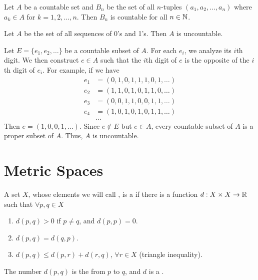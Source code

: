 \documentclass{mathnotes}
\begin{document}
\begin{prop}
  Let $A$ be a countable set and $B_n$ be the set of all $n$-tuples
  $(a_1,a_2,\ldots,a_n)$ where $a_k\in A$ for $k=1,2,\ldots,n$. Then $B_n$ is
  countable for all $n\in\mathbb{N}$.
\end{prop}

\begin{thm}
  Let $A$ be the set of all sequences of 0's and 1's. Then $A$ is uncountable.
\end{thm}

\begin{pf}
  Let $E=\{e_1,e_2,\ldots\}$ be a countable subset of $A$. For each $e_i$, we
  analyze its $i$th digit. We then construct $e\in A$ such that the $i$th digit
  of $e$ is the opposite of the $i$th digit of $e_i$. For example, if we have
  \begin{align*}
    e_1&=(\boxed{0},1,0,1,1,1,0,1,\ldots)\\
    e_2&=(1,\boxed{1},0,1,0,1,1,0,\ldots)\\
    e_3&=(0,0,\boxed{1},1,0,0,1,1,\ldots)\\
    e_4&=(1,0,1,\boxed{0},1,0,1,1,\ldots)\\
       &\ldots
  \end{align*}
  Then $e=(1,0,0,1,\ldots)$. Since $e\notin E$ but $e\in A$, every countable
  subset of $A$ is a proper subset of $A$. Thus, $A$ is uncountable.
\end{pf}

\section*{Metric Spaces}

\begin{bdefi}
  A set $X$, whose elements we will call , is a  if there is a function $d:X\times X\to\mathbb{R}$ such that $\forall p,q\in
  X$
  \begin{enumerate}
    \item $d(p,q)>0$ if $p\ne q$, and $d(p,p)=0$.
    \item $d(p,q)=d(q,p)$.
    \item $d(p,q)\le d(p,r)+d(r,q)$, $\forall r\in X$ (triangle inequality).
  \end{enumerate}
\end{bdefi}

\begin{defi}
  The number $d(p,q)$ is the  from $p$ to $q$, and $d$ is a
  .
\end{defi}
\end{document}

